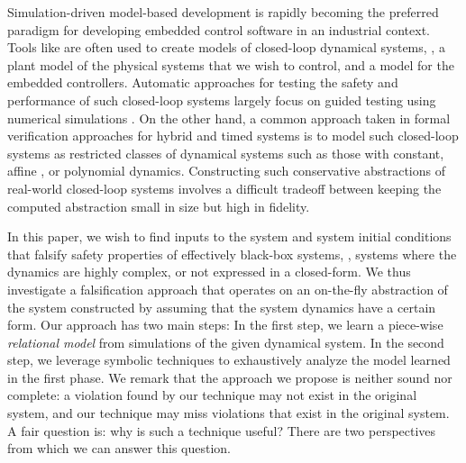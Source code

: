 Simulation-driven model-based development is rapidly becoming the
preferred paradigm for developing embedded control software in an
industrial context.  Tools like \SIMULINK are often used to create
models of closed-loop dynamical systems, \ie, a plant model of the
physical systems that we wish to control, and a model for the embedded
controllers.  Automatic approaches for testing the safety and
performance of such closed-loop systems largely focus on guided
testing using numerical simulations
\cite{annpureddy2011s,donze2010breach,deshmukh2015stochastic,dreossi2015efficient,akazaki}.
On the other hand, a common approach taken in formal verification
approaches for hybrid and timed systems is to model such closed-loop
systems as restricted classes of dynamical systems such as those with
constant, affine \cite{frehse2011spaceex}, or polynomial
\cite{chen2015reachability} dynamics. Constructing such conservative
abstractions of real-world closed-loop systems involves a difficult
tradeoff between keeping the computed abstraction small in size but
high in fidelity.

In this paper, we wish to find inputs to the system and system initial
conditions that falsify safety properties of effectively black-box
systems, \ie, systems where the dynamics are highly complex, or not
expressed in a closed-form. We thus investigate a falsification
approach that operates on an on-the-fly abstraction of the system
constructed by assuming that the system dynamics have a certain form.
Our approach has two main steps: In the first step, we learn a
piece-wise {\em relational model} from simulations of the given
dynamical system. In the second step, we leverage symbolic techniques
to exhaustively analyze the model learned in the first phase. We
remark that the approach we propose is neither sound nor complete: a
violation found by our technique may not exist in the original system,
and our technique may miss violations that exist in the original
system. A fair question is: why is such a technique useful? There are
two perspectives from which we can answer this question.

